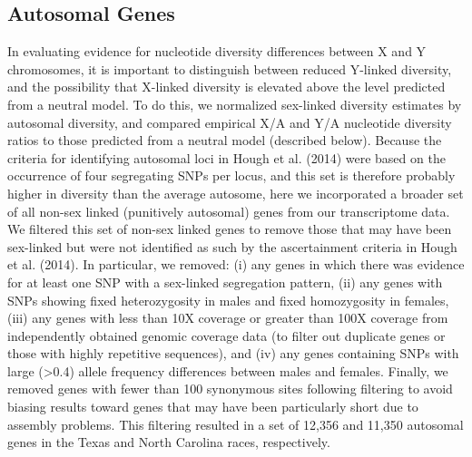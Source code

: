 \documentclass[9pt,twocolumn,twoside]{gsajnl}
\begin{document}
\subsection*{Autosomal Genes}
In evaluating evidence for nucleotide diversity differences between X and Y chromosomes, it is important to distinguish between reduced Y-linked diversity, and the possibility that X-linked diversity is elevated above the level predicted from a neutral model. To do this, we normalized sex-linked diversity estimates by autosomal diversity, and compared empirical X/A and Y/A nucleotide diversity ratios to those predicted from a neutral model (described below). Because the criteria for identifying autosomal loci in Hough et al. (2014) were based on the occurrence of four segregating SNPs per locus, and this set is therefore probably higher in diversity than the average autosome, here we incorporated a broader set of all non-sex linked (punitively autosomal) genes from our transcriptome data. We filtered this set of non-sex linked genes to remove those that may have been sex-linked but were not identified as such by the ascertainment criteria in Hough et al. (2014). In particular, we removed: (i) any genes in which there was evidence for at least one SNP with a sex-linked segregation pattern, (ii) any genes with SNPs showing fixed heterozygosity in males and fixed homozygosity in females, (iii) any genes with less than 10X coverage or greater than 100X coverage from independently obtained genomic coverage data (to filter out duplicate genes or those with highly repetitive sequences), and (iv) any genes containing SNPs with large (>0.4) allele frequency differences between males and females. Finally, we removed genes with fewer than 100 synonymous sites following filtering to avoid biasing results toward genes that may have been particularly short due to assembly problems. This filtering resulted in a set of 12,356 and 11,350 autosomal genes in the Texas and North Carolina races, respectively.
\end{document}
